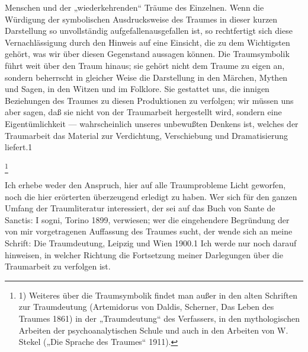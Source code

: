\documentclass[twoside=true,titlepage=false,open=any, parskip=never, fontsize=10pt, headings=small, chapterprefix=false, appendixprefix=false]{scrbook}
\begin{document}
         
            
            
            
        \pstart
        Menschen und der „wiederkehrenden“ Träume des Einzelnen. Wenn die
               Würdigung der symbolischen Ausdrucksweise des Traumes in dieser kurzen
               Darstellung so unvollständig aufgefallenausgefallen ist, so rechtfertigt sich diese
               Vernachlässigung durch den Hinweis auf eine Einsicht, die zu dem
               Wichtigsten gehört, was wir über diesen Gegenstand aussagen können. Die
               Traumsymbolik führt weit über den Traum hinaus; sie gehört nicht dem Traume
               zu eigen an, sondern beherrscht in gleicher Weise die Darstellung in den
               Märchen, Mythen und Sagen, in den Witzen und im Folklore. Sie gestattet uns, die
               innigen Beziehungen des Traumes zu diesen Produktionen zu verfolgen; wir müssen
               uns aber sagen, daß sie nicht von der Traumarbeit hergestellt wird, sondern
               eine Eigentümlichkeit — wahrscheinlich unseres unbewußten Denkens
               ist, welches der Traumarbeit das Material zur Verdichtung, Verschiebung und
               Dramatisierung liefert.1
        \pend
    
            
        \footnote{1) Weiteres über die
               Traumsymbolik findet man außer in den alten Schriften zur Traumdeutung (Artemidorus von Daldis, Scherner, Das Leben des
               Traumes 1861) in der „Traumdeutung“ des Verfassers, in den mythologischen
               Arbeiten der psychoanalytischen Schule und auch in den Arbeiten von W. Stekel („Die Sprache des Traumes“ 1911).}
    
         
            
            
            \pstart{}\pend
            
        \pstart
        Ich erhebe weder den Anspruch, hier auf alle Traumprobleme Licht geworfen, noch
               die hier erörterten überzeugend erledigt zu haben. Wer sich für den ganzen
               Umfang der Traumliteratur interessiert, der sei auf das Buch von Sante de Sanctis:
               I sogni, Torino 1899, verwiesen; wer die eingehendere
                  Begründung der von mir vorgetragenen Auffassung des Traumes
               sucht, der wende sich an meine Schrift: Die
                  Traumdeutung, Leipzig und Wien 1900.1 Ich werde nur noch darauf hinweisen, in welcher Richtung die
               Fortsetzung meiner Darlegungen über die Traumarbeit zu verfolgen ist.
        \pend
    
\end{document}
